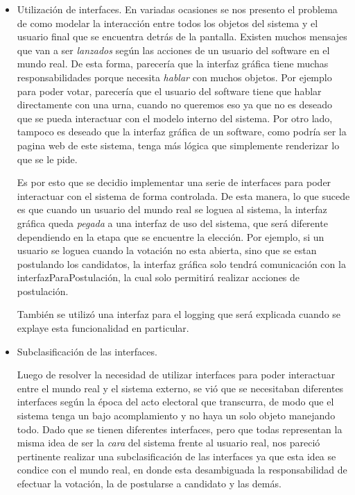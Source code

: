 \begin{itemize}
\item Utilizaci\'on de interfaces. En variadas ocasiones se nos presento el problema de como modelar la interacci\'on entre todos los objetos del sistema y el usuario final que se encuentra detr\'as de la pantalla. Existen muchos mensajes que van a ser \emph{lanzados} seg\'un las acciones de un usuario del software en el mundo real. De esta forma, parecer\'ia que la interfaz gr\'afica tiene muchas responsabilidades porque necesita \emph{hablar} con muchos objetos. Por ejemplo para poder votar, parecer\'ia que el usuario del software tiene que hablar directamente con una urna, cuando no queremos eso ya que no es deseado que se pueda interactuar con el modelo interno del sistema. Por otro lado, tampoco es deseado que la interfaz gr\'afica de un software, como podr\'ia ser la pagina web de este sistema, tenga m\'as l\'ogica que simplemente renderizar lo que se le pide.

Es por esto que se decidio implementar una serie de interfaces para poder interactuar con el sistema de forma controlada. De esta manera, lo que sucede es que cuando un usuario del mundo real se loguea al sistema, la interfaz gr\'afica queda \emph{pegada} a una interfaz de uso del sistema, que ser\'a diferente dependiendo en la etapa que se encuentre la elecci\'on. Por ejemplo, si un usuario se loguea cuando la votaci\'on no esta abierta, sino que se estan postulando los candidatos, la interfaz gr\'afica solo tendr\'a comunicaci\'on con la interfazParaPostulaci\'on, la cual solo permitir\'a realizar acciones de postulaci\'on.

Tambi\'en se utiliz\'o una interfaz para el logging que ser\'a explicada cuando se explaye esta funcionalidad en particular.

\item Subclasificaci\'on de las interfaces.

Luego de resolver la necesidad de utilizar interfaces para poder interactuar entre el mundo real y el sistema externo, se vi\'o que se necesitaban diferentes interfaces seg\'un la \'epoca del acto electoral que transcurra, de modo que el sistema tenga un bajo acomplamiento y no haya un solo objeto manejando todo. Dado que se tienen diferentes interfaces, pero que todas representan la misma idea de ser la \emph{cara} del sistema frente al usuario real, nos pareci\'o pertinente realizar una subclasificaci\'on de las interfaces ya que esta idea se condice con el mundo real, en donde esta desambiguada la responsabilidad de efectuar la votaci\'on, la de postularse a candidato y las dem\'as.


\end{itemize}


